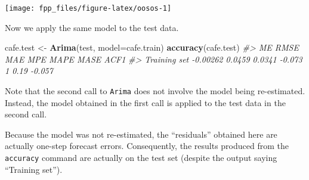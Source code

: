 \documentclass[]{book}
\newenvironment{Shaded}{\begin{snugshade}}{\end{snugshade}}
\newcommand{\CommentTok}[1]{\textcolor[rgb]{0.56,0.35,0.01}{\textit{#1}}}
\newcommand{\DataTypeTok}[1]{\textcolor[rgb]{0.13,0.29,0.53}{#1}}
\newcommand{\DecValTok}[1]{\textcolor[rgb]{0.00,0.00,0.81}{#1}}
\newcommand{\KeywordTok}[1]{\textcolor[rgb]{0.13,0.29,0.53}{\textbf{#1}}}
\newcommand{\NormalTok}[1]{#1}
\newcommand{\OperatorTok}[1]{\textcolor[rgb]{0.81,0.36,0.00}{\textbf{#1}}}
\newcommand{\StringTok}[1]{\textcolor[rgb]{0.31,0.60,0.02}{#1}}
\begin{document}
\begin{Shaded}
\end{Shaded}

\begin{center}\texttt{[image: fpp\_files/figure-latex/oosos-1]} \end{center}

Now we apply the same model to the test data.

\begin{Shaded}
\begin{Highlighting}[]
\NormalTok{cafe.test <-}\StringTok{ }\KeywordTok{Arima}\NormalTok{(test, }\DataTypeTok{model=}\NormalTok{cafe.train)}
\KeywordTok{accuracy}\NormalTok{(cafe.test)}
\CommentTok{#>                    ME   RMSE    MAE    MPE MAPE MASE   ACF1}
\CommentTok{#> Training set -0.00262 0.0459 0.0341 -0.073    1 0.19 -0.057}
\end{Highlighting}
\end{Shaded}

Note that the second call to \texttt{Arima} does not involve the model being re-estimated. Instead, the model obtained in the first call is applied to the test data in the second call.

Because the model was not re-estimated, the ``residuals'' obtained here are actually one-step forecast errors. Consequently, the results produced from the \texttt{accuracy} command are actually on the test set (despite the output saying ``Training set'').
\end{document}
